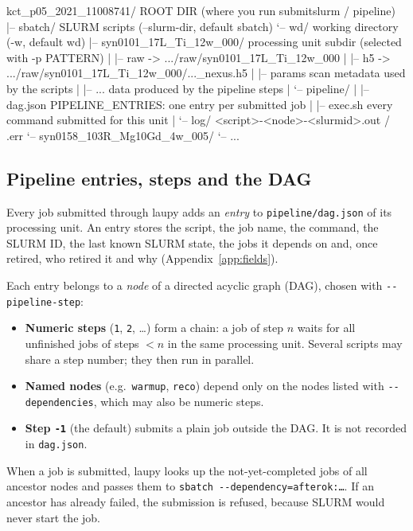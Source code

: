 \documentclass[11pt,a4paper]{article}
\newcommand{\cmd}[1]{\texttt{#1}}
\begin{document}
\begin{terminaltiny}
kct_p05_2021_11008741/               ROOT DIR (where you run submitslurm / pipeline)
|-- sbatch/                          SLURM scripts           (--slurm-dir, default sbatch)
`-- wd/                              working directory       (-w, default wd)
    |-- syn0101_17L_Ti_12w_000/      processing unit subdir  (selected with -p PATTERN)
    |   |-- raw -> .../raw/syn0101_17L_Ti_12w_000
    |   |-- h5  -> .../raw/syn0101_17L_Ti_12w_000/..._nexus.h5
    |   |-- params                   scan metadata used by the scripts
    |   |-- ...                      data produced by the pipeline steps
    |   `-- pipeline/
    |       |-- dag.json             PIPELINE_ENTRIES: one entry per submitted job
    |       |-- exec.sh              every command submitted for this unit
    |       `-- log/                 <script>-<node>-<slurmid>.out / .err
    `-- syn0158_103R_Mg10Gd_4w_005/
        `-- ...
\end{terminaltiny}

\subsection{Pipeline entries, steps and the DAG}

Every job submitted through laupy adds an \emph{entry} to \cmd{pipeline/dag.json} of its
processing unit. An entry stores the script, the job name, the command, the SLURM ID, the last
known SLURM state, the jobs it depends on and, once retired, who retired it and why
(Appendix~\ref{app:fields}).

Each entry belongs to a \emph{node} of a directed acyclic graph (DAG), chosen with
\cmd{-{}-pipeline-step}:

\begin{itemize}
  \item \textbf{Numeric steps} (\cmd{1}, \cmd{2}, \ldots) form a chain: a job of step $n$ waits for
    all unfinished jobs of steps $<n$ in the same processing unit. Several scripts may share a step
    number; they then run in parallel.
  \item \textbf{Named nodes} (e.g.\ \cmd{warmup}, \cmd{reco}) depend only on the nodes listed with
    \cmd{-{}-dependencies}, which may also be numeric steps.
  \item \textbf{Step \cmd{-1}} (the default) submits a plain job outside the DAG. It is not
    recorded in \cmd{dag.json}.
\end{itemize}

When a job is submitted, laupy looks up the not-yet-completed jobs of all ancestor nodes and passes
them to \cmd{sbatch -{}-dependency=afterok:\ldots}. If an ancestor has already failed, the
submission is refused, because SLURM would never start the job.
\end{document}
